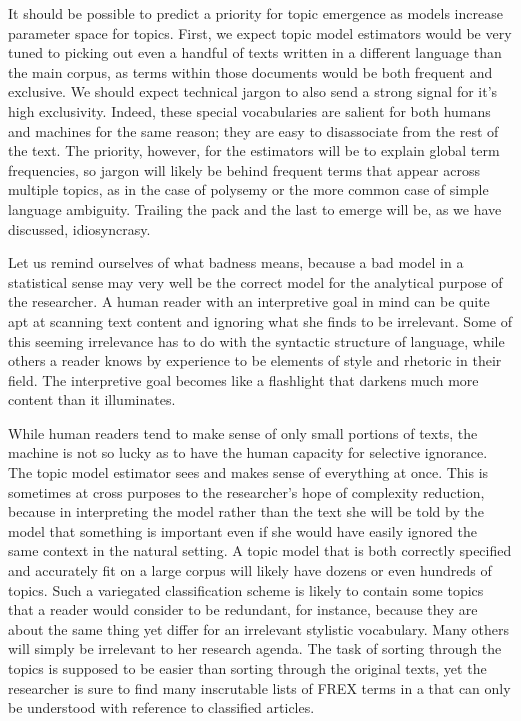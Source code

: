 \documentclass[]{book}
\theoremstyle{definition}
\theoremstyle{definition}
\theoremstyle{definition}
\theoremstyle{remark}
\begin{document}
It should be possible to predict a priority for topic emergence as
models increase parameter space for topics. First, we expect topic model
estimators would be very tuned to picking out even a handful of texts
written in a different language than the main corpus, as terms within
those documents would be both frequent and exclusive. We should expect
technical jargon to also send a strong signal for it's high exclusivity.
Indeed, these special vocabularies are salient for both humans and
machines for the same reason; they are easy to disassociate from the
rest of the text. The priority, however, for the estimators will be to
explain global term frequencies, so jargon will likely be behind
frequent terms that appear across multiple topics, as in the case of
polysemy or the more common case of simple language ambiguity. Trailing
the pack and the last to emerge will be, as we have discussed,
idiosyncrasy.

Let us remind ourselves of what badness means, because a bad model in a
statistical sense may very well be the correct model for the analytical
purpose of the researcher. A human reader with an interpretive goal in
mind can be quite apt at scanning text content and ignoring what she
finds to be irrelevant. Some of this seeming irrelevance has to do with
the syntactic structure of language, while others a reader knows by
experience to be elements of style and rhetoric in their field. The
interpretive goal becomes like a flashlight that darkens much more
content than it illuminates.

While human readers tend to make sense of only small portions of texts,
the machine is not so lucky as to have the human capacity for selective
ignorance. The topic model estimator sees and makes sense of everything
at once. This is sometimes at cross purposes to the researcher's hope of
complexity reduction, because in interpreting the model rather than the
text she will be told by the model that something is important even if
she would have easily ignored the same context in the natural setting. A
topic model that is both correctly specified and accurately fit on a
large corpus will likely have dozens or even hundreds of topics. Such a
variegated classification scheme is likely to contain some topics that a
reader would consider to be redundant, for instance, because they are
about the same thing yet differ for an irrelevant stylistic vocabulary.
Many others will simply be irrelevant to her research agenda. The task
of sorting through the topics is supposed to be easier than sorting
through the original texts, yet the researcher is sure to find many
inscrutable lists of FREX terms in a that can only be understood with
reference to classified articles.
\end{document}
